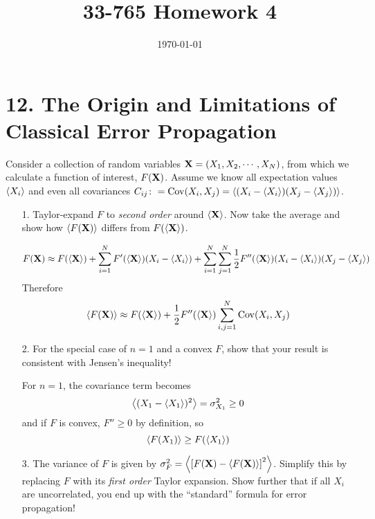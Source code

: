 \documentclass[a4paper,twoside]{article}
\title{33-765 Homework 4}
\date{\today}
\begin{document}
\maketitle

\section*{12. The Origin and Limitations of Classical Error Propagation}
Consider a collection of random variables $ \vb{X} = (X_1, X_2, \cdots, X_N) $, from which we calculate a function of interest, $ F(\vb{X}) $. Assume we know all expectation values $ \ev{X_i} $ and even all covariances $ C_{ij} \colon = \Cov(X_i, X_j) = \ev{(X_i - \ev{X_i})(X_j - \ev{X_j})} $.
\begin{itemize}
    \item[1.] Taylor-expand $ F $ to \textit{second order} around $ \ev{\vb{X}} $. Now take the average and show how $ \ev{F(\vb{X})} $ differs from $ F(\ev{\vb{X}}) $.
        \begin{problem}
            \begin{equation}
                F(\vb{X}) \approx F(\ev{\vb{X}}) + \sum_{i=1}^{N} F'(\ev{\vb{X}})(X_i - \ev{X_i }) + \sum_{i=1}^{N} \sum_{j=1}^{N} \frac{1}{2} F''(\ev{\vb{X}})(X_i - \ev{X_i})(X_j - \ev{X_j})
            \end{equation}
            Therefore
            \begin{equation}
                \ev{F(\vb{X})} \approx F(\ev{\vb{X}}) + \frac{1}{2} F''(\ev{\vb{X}}) \sum_{i,j=1}^{N} \Cov(X_i, X_j)
            \end{equation}
        \end{problem}
    \item[2.] For the special case of $ n=1 $ and a convex $ F $, show that your result is consistent with Jensen's inequality!
        \begin{problem}
            For $ n = 1 $, the covariance term becomes
            \begin{equation}
                \ev{(X_1 - \ev{X_1})^2} = \sigma^2_{X_1} \geq 0
            \end{equation}
            and if $ F $ is convex, $ F'' \geq 0 $ by definition, so
            \begin{equation}
                \ev{F(X_1)} \geq F(\ev{X_1})
            \end{equation}
        \end{problem}
    \item[3.] The variance of $ F $ is given by $ \sigma_F^2 = \ev{\left[ F(\vb{X}) - \ev{F(\vb{X})} \right]^2} $. Simplify this by replacing $ F $ with its \textit{first order} Taylor expansion. Show further that if all $ X_i $ are uncorrelated, you end up with the ``standard'' formula for error propagation!

\end{itemize}
\end{document}
